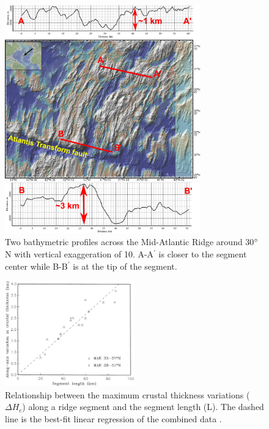 \documentclass[draft,gc]{agutex}
\begin{document}
\begin{figure}[h]
\noindent\includegraphics[width=20pc]{./Figures/fig_Intro1_2_30N_MAR_offAxisMorphologies.eps}
 \caption[Two bathymetric profiles across the Mid-Atlantic Ridge around 30$\degree$N with vertical exaggeration of 10.]{Two bathymetric profiles across the Mid-Atlantic Ridge around 30$\degree$N with vertical exaggeration of 10. A-A$^{\prime}$ is closer to the segment center while B-B$^{\prime}$ is at the tip of the segment.}
  \label{fig_Intro2_1}
\end{figure}

\begin{figure}[h]
\noindent\includegraphics[width=0.5\textwidth]{./Figures/fig_Intro3_1.eps}
 \caption[Relationship between the maximum crustal thickness variations ($\Delta H_{c}$) along a ridge segment and the segment length (L).]{Relationship between the maximum crustal thickness variations ($\Delta H_{c}$) along a ridge segment and the segment length (L). The dashed line is the best-fit linear regression of the combined data \citep{Chen1999}.}
 \label{fig_Intro3_1}
\end{figure}
\end{document}
